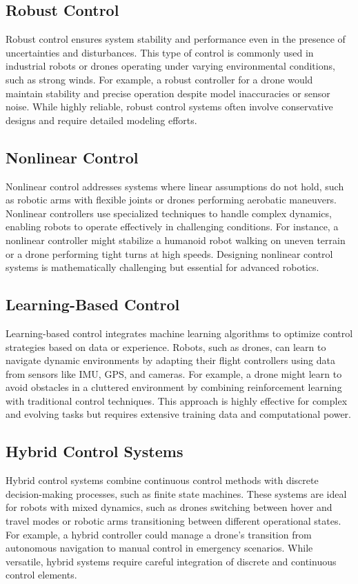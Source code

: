 \subsection{Robust Control}
Robust control ensures system stability and performance even in the presence of uncertainties and disturbances. This type of control is commonly used in industrial robots or drones operating under varying environmental conditions, such as strong winds. For example, a robust controller for a drone would maintain stability and precise operation despite model inaccuracies or sensor noise. While highly reliable, robust control systems often involve conservative designs and require detailed modeling efforts.

\subsection{Nonlinear Control}
Nonlinear control addresses systems where linear assumptions do not hold, such as robotic arms with flexible joints or drones performing aerobatic maneuvers. Nonlinear controllers use specialized techniques to handle complex dynamics, enabling robots to operate effectively in challenging conditions. For instance, a nonlinear controller might stabilize a humanoid robot walking on uneven terrain or a drone performing tight turns at high speeds. Designing nonlinear control systems is mathematically challenging but essential for advanced robotics.

\subsection{Learning-Based Control}
Learning-based control integrates machine learning algorithms to optimize control strategies based on data or experience. Robots, such as drones, can learn to navigate dynamic environments by adapting their flight controllers using data from sensors like IMU, GPS, and cameras. For example, a drone might learn to avoid obstacles in a cluttered environment by combining reinforcement learning with traditional control techniques. This approach is highly effective for complex and evolving tasks but requires extensive training data and computational power.

\subsection{Hybrid Control Systems}
Hybrid control systems combine continuous control methods with discrete decision-making processes, such as finite state machines. These systems are ideal for robots with mixed dynamics, such as drones switching between hover and travel modes or robotic arms transitioning between different operational states. For example, a hybrid controller could manage a drone's transition from autonomous navigation to manual control in emergency scenarios. While versatile, hybrid systems require careful integration of discrete and continuous control elements.


